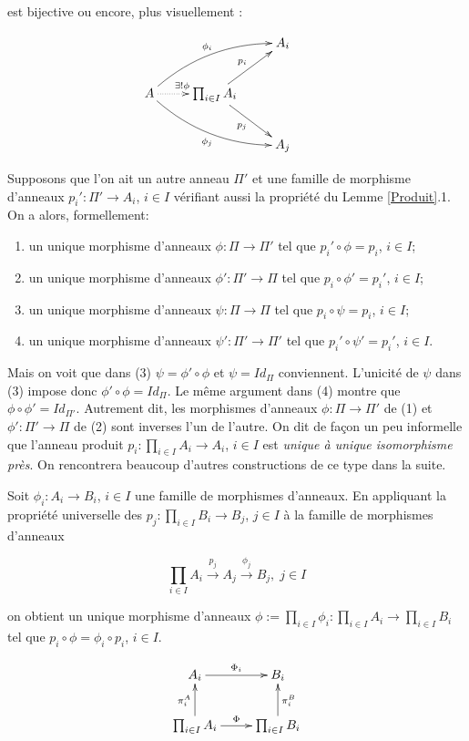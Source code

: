 est bijective ou encore, plus visuellement :

\[\xymatrix{&&A_i \\
A\ar@{.>}[r]^{\exists ! \phi}\ar@/^1pc/[urr]^{\phi_i}\ar@/_1pc/[drr]_{\phi_j}&\prod_{i\in I}A_i\ar[ur]^{p_i}\ar[dr]_{p_j}\\
&&A_j& }\]

Supposons que l'on ait un autre anneau  $\Pi'$ et une famille de morphisme
d'anneaux $p_i':\Pi'\rightarrow A_i$, $i\in I$ vérifiant aussi la propriété du
Lemme \ref{Produit}.1. On a alors, formellement:

\begin{enumerate}[leftmargin=* ,parsep=0cm,itemsep=0cm,topsep=0cm]
    \item un unique morphisme d'anneaux $\phi:\Pi\rightarrow \Pi'$ tel que
        $p_i'\circ \phi=p_i$, $i\in I$;
    \item un unique morphisme d'anneaux $\phi':\Pi'\rightarrow \Pi$ tel que
        $p_i\circ \phi'=p_i'$, $i\in I$;
    \item un unique morphisme d'anneaux $\psi:\Pi\rightarrow \Pi$ tel que
        $p_i\circ \psi=p_i$, $i\in I$;
    \item un unique morphisme d'anneaux $\psi':\Pi'\rightarrow \Pi'$ tel
        que $p_i'\circ \psi'=p_i'$, $i\in I$.
\end{enumerate}

Mais on voit que dans (3) $\psi=\phi'\circ \phi$ et $\psi=Id_\Pi$ conviennent.
L'unicité de $\psi$ dans (3) impose donc $\phi'\circ \phi=Id_\Pi$. Le même
argument dans (4) montre que $\phi\circ \phi'=Id_{\Pi'}$. Autrement dit, les
morphismes d'anneaux $\phi:\Pi\rightarrow \Pi'$ de (1) et
$\phi':\Pi'\rightarrow \Pi$ de (2) sont inverses l'un de l'autre. On dit de
façon un peu informelle que l'anneau produit  $p_i:\prod_{i\in I}A_i\rightarrow
A_i$, $i\in I$ est \emph{unique à unique isomorphisme près}. On rencontrera
beaucoup d'autres constructions de ce type dans la suite.

\begin{remarque}
    Soit $\phi_i:A_i\rightarrow B_i$, $i\in I$ une famille de morphismes
    d'anneaux.  En appliquant la propriété universelle des $p_j:\prod_{i\in
    I}B_i\rightarrow B_j$, $j\in I$ à la famille de morphismes d'anneaux

    \[\prod_{i\in
    I}A_i\stackrel{p_j}{\rightarrow}A_j\stackrel{\phi_j}{\rightarrow} B_j,\;
    j\in I\]

    on obtient un unique morphisme d'anneaux $\phi:=\prod_{i\in
    I}\phi_i:\prod_{i\in I}A_i\rightarrow \prod_{i\in I} B_i$ tel que $p_i\circ
    \phi=\phi_i\circ p_i$, $i\in I$.

    \[\xymatrix{ A_i \ar[r]^{\Phi_i} & B_i \\ \prod_{i\in I} A_i
    \ar[u]^{\pi^A_i} \ar[r]^\Phi & \prod_{i\in I}B_i \ar[u]_{\pi^B_i} }\]
\end{remarque}

